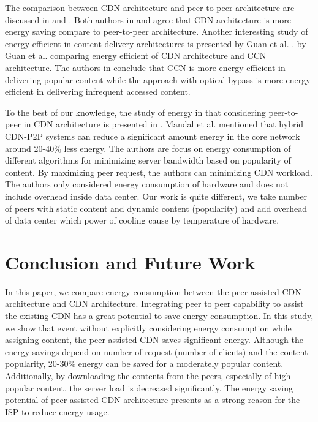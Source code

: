 \documentclass[JIP]{ipsj}
\begin{document}
The comparison between CDN architecture and peer-to-peer architecture are discussed in \cite{baliga2007energy} and \cite{feldmann2010energy}.
Both authors in \cite{baliga2007energy} and \cite{feldmann2010energy} agree that CDN architecture is more energy saving compare to peer-to-peer architecture. 
Another interesting study of energy efficient in content delivery architectures is presented by Guan et al. \cite{5963557}.
by Guan et al. \cite{5963557} comparing energy efficient of CDN architecture and CCN architecture.
The authors in \cite{5963557} conclude that CCN is more energy efficient in delivering popular content while the approach with optical bypass is more energy efficient in delivering infrequent accessed content.

To the best of our knowledge, the study of energy in that considering peer-to-peer in CDN architecture is presented in \cite{6524219}.
Mandal et al. \cite{6524219} mentioned that hybrid CDN-P2P systems can reduce a significant amount energy in the core network around 20-40\% less energy.  
The authors are focus on energy consumption of different algorithms for minimizing server bandwidth based on popularity of content.  
By maximizing peer request, the authors can minimizing CDN workload. 
The authors only considered energy consumption of hardware and does not include overhead inside data center.  
Our work is quite different, we take number of peers with static content and dynamic content (popularity) and add overhead of data center which power of cooling cause by temperature of hardware.

 


\section{Conclusion and Future Work}\label{conclusion}

In this paper, we compare energy consumption between the peer-assisted CDN architecture and CDN architecture. 
Integrating peer to peer capability to assist the existing CDN has a great potential to save energy consumption.
In this study, we show that event without explicitly considering energy consumption while assigning content, the peer assisted CDN saves significant energy.
Although the energy savings depend on number of request (number of clients) and the content popularity, 20-30\% energy can be saved for a moderately popular content.
Additionally, by downloading the contents from the peers, especially of high popular content, the server load is decreased significantly.
The energy saving potential of peer assisted CDN architecture presents as a strong reason for the ISP to reduce energy usage.  
\end{document}
